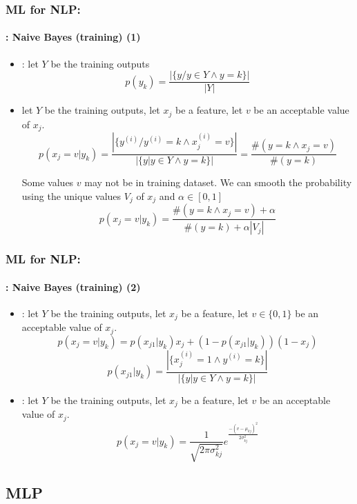 \documentclass[xcolor=table]{beamer}
\begin{document}
	\begin{frame}
		\frametitle{ML for NLP: \insertsection}
		\framesubtitle{\insertsubsection: Naive Bayes (training) (1)}
		\small
		
		\begin{itemize}
			\item {}: let $ Y $ be the training outputs
			\[p(y_k) = \frac{|\{y / y \in Y \wedge y = k\}|}{|Y|}\]
			
			\item {} let $ Y $ be the training outputs, let $ x_j $ be a feature, let $ v $ be an acceptable value of $ x_j $.
			\[p(x_j = v|y_k) = \frac{|\{y^{(i)} / y^{(i)} = k \wedge x^{(i)}_j = v\}|}{|\{y | y \in Y \wedge y = k\}|} = \frac{\#(y = k \wedge x_j = v)}{\#(y = k)}\]
			
			Some values $v$ may not be in training dataset. We can smooth the probability using the unique values $ V_j $ of $ x_j $ and $ \alpha \in [0, 1] $
			\[p(x_j = v|y_k) = \frac{\#(y = k \wedge x_j = v) + \alpha}{\#(y = k) + \alpha |V_j|}\]
		\end{itemize}
		
	\end{frame}

	\begin{frame}
		\frametitle{ML for NLP: \insertsection}
		\framesubtitle{\insertsubsection: Naive Bayes (training) (2)}
		\small
		
		\begin{itemize}
			\item {}: let $ Y $ be the training outputs, let $ x_j $ be a feature, let $ v \in \{0, 1\}$ be an acceptable value of $ x_j $.
			\[p(x_j = v|y_k) = p(x_{j1}|y_k) x_j + (1-p(x_{j1}|y_k)) (1-x_j)\]
			\[p(x_{j1}|y_k) = \frac{|\{x_j^{(i)} = 1 \wedge y^{(i)} = k\}|}{|\{y | y \in Y \wedge y = k\}|}\]
			\item {}: let $ Y $ be the training outputs, let $ x_j $ be a feature, let $ v $ be an acceptable value of $ x_j $.
			\[p(x_j = v|y_k) = \frac{1}{\sqrt{2\pi \sigma_{kj}^2}} e^\frac{-(v-\mu_{kj})^2}{2 \sigma_{kj}^2}\]
		\end{itemize}
		
	\end{frame}
	
	\subsection{MLP}
	
\end{document}
